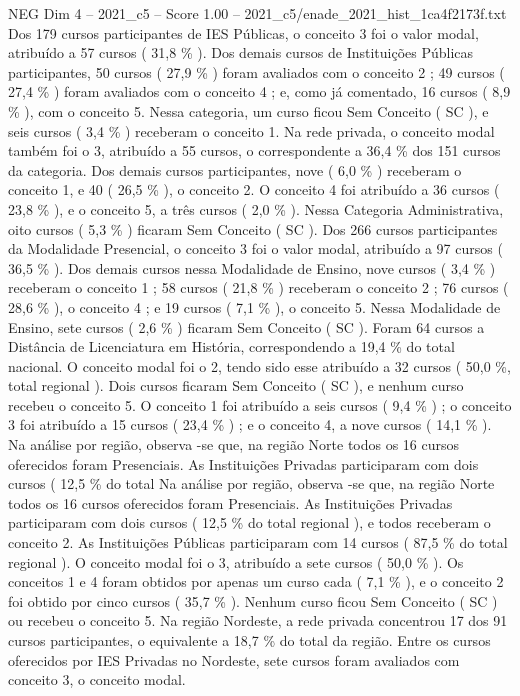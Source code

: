 \begin{textsample}{NEG Dim 4 – 2021\_c5 – Score 1.00 – 2021\_c5/enade\_2021\_hist\_1ca4f2173f.txt}
Dos 179 cursos participantes de IES Públicas, o conceito 3 foi o valor modal, atribuído a 57 cursos ( 31,8 \% ).
Dos demais cursos de Instituições Públicas participantes, 50 cursos ( 27,9 \% ) foram avaliados com o conceito 2 ; 49 cursos ( 27,4 \% ) foram avaliados com o conceito 4 ; e, como já comentado, 16 cursos ( 8,9 \% ), com o conceito 5.
Nessa categoria, um curso ficou Sem Conceito ( SC ), e seis cursos ( 3,4 \% ) receberam o conceito 1.
Na rede privada, o conceito modal também foi o 3, atribuído a 55 cursos, o correspondente a 36,4 \% dos 151 cursos da categoria.
Dos demais cursos participantes, nove ( 6,0 \% ) receberam o conceito 1, e 40 ( 26,5 \% ), o conceito 2.
O conceito 4 foi atribuído a 36 cursos ( 23,8 \% ), e o conceito 5, a três cursos ( 2,0 \% ).
Nessa Categoria Administrativa, oito cursos ( 5,3 \% ) ficaram Sem Conceito ( SC ).
Dos 266 cursos participantes da Modalidade Presencial, o conceito 3 foi o valor modal, atribuído a 97 cursos ( 36,5 \% ).
Dos demais cursos nessa Modalidade de Ensino, nove cursos ( 3,4 \% ) receberam o conceito 1 ; 58 cursos ( 21,8 \% ) receberam o conceito 2 ; 76 cursos ( 28,6 \% ), o conceito 4 ; e 19 cursos ( 7,1 \% ), o conceito 5.
Nessa Modalidade de Ensino, sete cursos ( 2,6 \% ) ficaram Sem Conceito ( SC ).
Foram 64 cursos a Distância de Licenciatura em História, correspondendo a 19,4 \% do total nacional.
O conceito modal foi o 2, tendo sido esse atribuído a 32 cursos ( 50,0 \%, total regional ).
Dois cursos ficaram Sem Conceito ( SC ), e nenhum curso recebeu o conceito 5.
O conceito 1 foi atribuído a seis cursos ( 9,4 \% ) ; o conceito 3 foi atribuído a 15 cursos ( 23,4 \% ) ; e o conceito 4, a nove cursos ( 14,1 \% ).
Na análise por região, observa -se que, na região Norte todos os 16 cursos oferecidos foram Presenciais.
As Instituições Privadas participaram com dois cursos ( 12,5 \% do total Na análise por região, observa -se que, na região Norte todos os 16 cursos oferecidos foram Presenciais.
As Instituições Privadas participaram com dois cursos ( 12,5 \% do total regional ), e todos receberam o conceito 2.
As Instituições Públicas participaram com 14 cursos ( 87,5 \% do total regional ).
O conceito modal foi o 3, atribuído a sete cursos ( 50,0 \% ).
Os conceitos 1 e 4 foram obtidos por apenas um curso cada ( 7,1 \% ), e o conceito 2 foi obtido por cinco cursos ( 35,7 \% ).
Nenhum curso ficou Sem Conceito ( SC ) ou recebeu o conceito 5.
Na região Nordeste, a rede privada concentrou 17 dos 91 cursos participantes, o equivalente a 18,7 \% do total da região.
Entre os cursos oferecidos por IES Privadas no Nordeste, sete cursos foram avaliados com conceito 3, o conceito modal.

\end{textsample}
